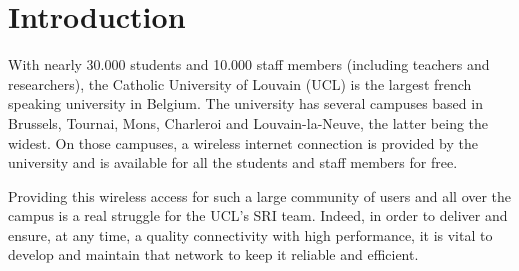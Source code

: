 
\chapter{Introduction} %

\label{Chapter1} %



With nearly 30.000 students and 10.000 staff members (including teachers and researchers), the Catholic University of Louvain (UCL) is the largest french speaking university in Belgium. The university has several campuses based in Brussels, Tournai, Mons, Charleroi and Louvain-la-Neuve, the latter being the widest. On those campuses, a wireless internet connection is provided by the university and is available for all the students and staff members for free.

Providing this wireless access for such a large community of users and all over the campus is a real struggle for the UCL's SRI team. Indeed, in order to deliver and ensure, at any time, a quality connectivity with high performance, it is vital to develop and maintain that network to keep it reliable and efficient.
 
